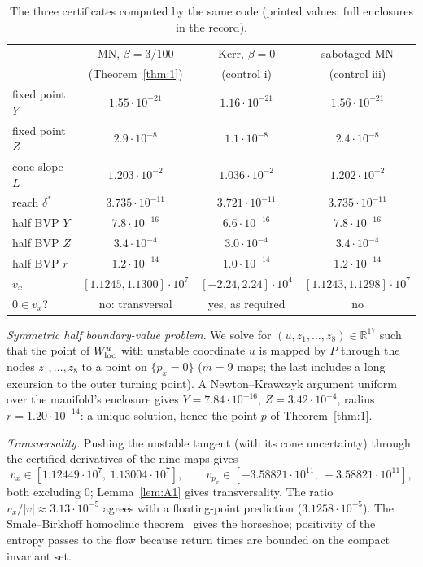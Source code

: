 \documentclass[11pt]{amsart}
\theoremstyle{remark}\newtheorem*{remark}{Remark}
\newcommand{\R}{\mathbb{R}}
\begin{document}
\begin{table}[h]
\centering\footnotesize\setlength\tabcolsep{4pt}
\begin{tabular}{@{}lccc@{}}
\toprule
 & MN, $\beta=3/100$ & Kerr, $\beta=0$ & sabotaged MN\\
 & (Theorem~\ref{thm:1}) & (control i) & (control iii)\\
\midrule
fixed point $Y$ & $1.55\cdot10^{-21}$ & $1.16\cdot10^{-21}$ & $1.56\cdot10^{-21}$\\
fixed point $Z$ & $2.9\cdot10^{-8}$ & $1.1\cdot10^{-8}$ & $2.4\cdot10^{-8}$\\
cone slope $L$ & $1.203\cdot10^{-2}$ & $1.036\cdot10^{-2}$ & $1.202\cdot10^{-2}$\\
reach $\delta^*$ & $3.735\cdot10^{-11}$ & $3.721\cdot10^{-11}$ & $3.735\cdot10^{-11}$\\
half BVP $Y$ & $7.8\cdot10^{-16}$ & $6.6\cdot10^{-16}$ & $7.8\cdot10^{-16}$\\
half BVP $Z$ & $3.4\cdot10^{-4}$ & $3.0\cdot10^{-4}$ & $3.4\cdot10^{-4}$\\
half BVP $r$ & $1.2\cdot10^{-14}$ & $1.0\cdot10^{-14}$ & $1.2\cdot10^{-14}$\\
$v_x$ & $[1.1245,1.1300]\cdot10^{7}$ & $[-2.24,2.24]\cdot10^{4}$ & $[1.1243,1.1298]\cdot10^{7}$\\
$0\in v_x$? & no: transversal & yes, as required & no\\
\bottomrule
\end{tabular}
\caption{The three certificates computed by the same code (printed values; full enclosures in the record).}
\label{tab:cert}
\end{table}

\emph{Symmetric half boundary-value problem.} We solve for $(u,z_1,\dots,z_8)\in\R^{17}$ such that the point of
$W^u_{\rm loc}$ with unstable coordinate $u$ is mapped by $P$ through the nodes $z_1,\dots,z_8$ to a point on
$\{p_x=0\}$ ($m=9$ maps; the last includes a long excursion to the outer turning point). A Newton--Krawczyk argument
uniform over the manifold's enclosure gives $Y=7.84\cdot10^{-16}$, $Z=3.42\cdot10^{-4}$, radius $r=1.20\cdot10^{-14}$:
a unique solution, hence the point $p$ of Theorem~\ref{thm:1}.

\emph{Transversality.} Pushing the unstable tangent (with its cone uncertainty) through the certified derivatives of the
nine maps gives
\[ v_x\in[1.12449\cdot10^{7},\ 1.13004\cdot10^{7}],\qquad v_{p_x}\in[-3.58821\cdot10^{11},\ -3.58821\cdot10^{11}], \]
both excluding $0$; Lemma~\ref{lem:A1} gives transversality. The ratio $v_x/|v|\approx3.13\cdot10^{-5}$ agrees with a
floating-point prediction ($3.1258\cdot10^{-5}$). The Smale--Birkhoff homoclinic theorem~\cite{Smale} gives the
horseshoe; positivity of the entropy passes to the flow because return times are bounded on the compact invariant set.
\end{document}
